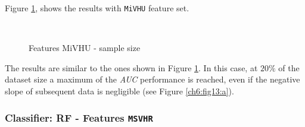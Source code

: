 Figure \ref{ch6:fig13}, shows the results with \texttt{MiVHU} feature set.

\begin{figure}[!htb]
  \centering
    \\
    \caption{Features MiVHU - sample size}
    \label{ch6:fig13}
\end{figure}

The results are similar to the ones shown in Figure \ref{ch6:fig13}. In this case, at $20\%$ of the dataset size a maximum of the \textit{AUC} performance is reached,
even if the negative slope of subsequent data is negligible (see Figure \ref{ch6:fig13:a}).

\vspace{0.5cm}

\subsubsection{Classifier: RF - Features \texttt{MSVHR}}

